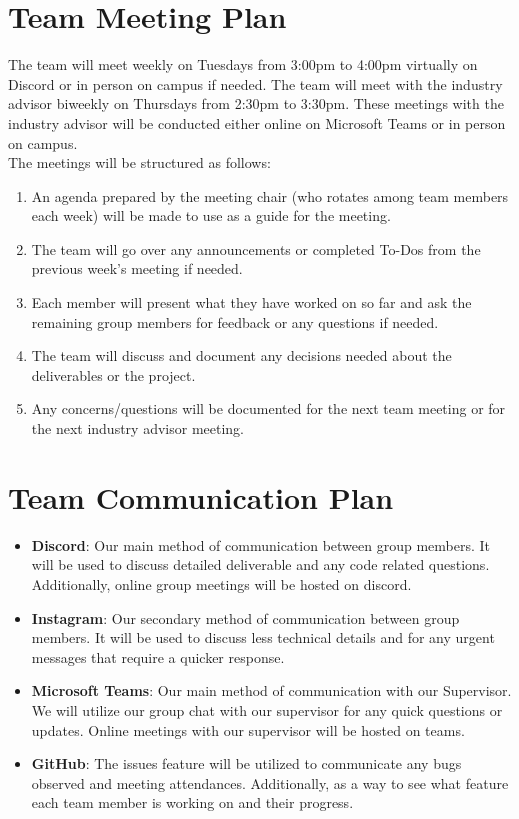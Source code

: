 \documentclass{article}
\begin{document}
\section{Team Meeting Plan}

The team will meet weekly on Tuesdays from 3:00pm to 4:00pm virtually on Discord or in person on campus if needed. 
The team will meet with the industry advisor biweekly on Thursdays from 2:30pm to 3:30pm. These meetings with the industry advisor will 
be conducted either online on Microsoft Teams or in person on campus. \\[1ex]
The meetings will be structured as follows: 
\begin{enumerate}
	\item An agenda prepared by the meeting chair (who rotates among team members each week) 
  will be made to use as a guide for the meeting.
	\item The team will go over any announcements or completed To-Dos from the previous week's 
  meeting if needed.
  \item Each member will present what they have worked on so far and ask the remaining group 
  members for feedback or any questions if needed.
  \item The team will discuss and document any decisions needed about the deliverables 
  or the project. 
  \item Any concerns/questions will be documented for the next team meeting or for the next 
  industry advisor meeting.
\end{enumerate}

\section{Team Communication Plan}

\begin{itemize}
    \item \textbf{Discord}: Our main method of communication between group members. It will be used to discuss detailed deliverable and any code related questions. Additionally, online group meetings will be hosted on discord. 
    \item \textbf{Instagram}: Our secondary method of communication between group members. It will be used to discuss less technical details and for any urgent messages that require a quicker response. 
    \item \textbf{Microsoft Teams}: Our main method of communication with our Supervisor. We will utilize our group chat with our supervisor for any quick questions or updates. Online meetings with our supervisor will be hosted on teams.
    \item \textbf{GitHub}: The issues feature will be utilized to communicate any bugs observed and meeting attendances. Additionally, as a way to see what feature each team member is working on and their progress. 
\end{itemize}
\end{document}

